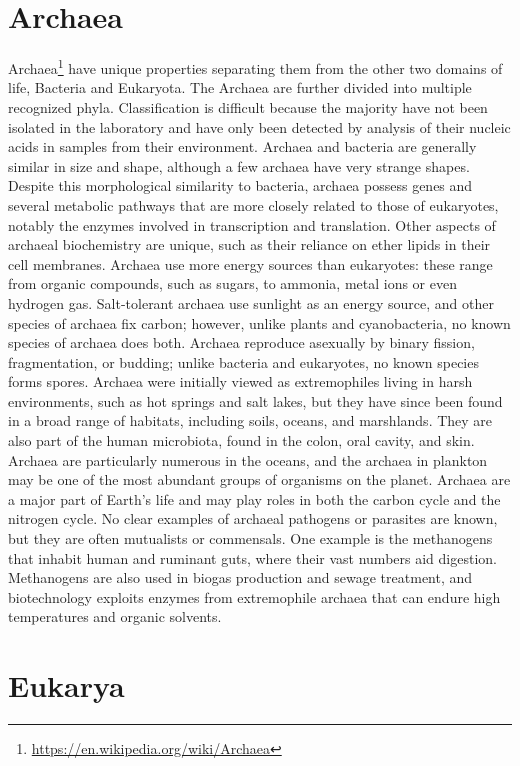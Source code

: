 \documentclass[]{book}
\let\rmarkdownfootnote\footnote%
\def\footnote{\protect\rmarkdownfootnote}
\renewcommand{\href}[2]{#2\footnote{\url{#1}}}
\theoremstyle{definition}
\theoremstyle{definition}
\theoremstyle{definition}
\theoremstyle{remark}
\begin{document}
\section{Archaea}\label{archaea}

\href{https://en.wikipedia.org/wiki/Archaea}{Archaea} have unique
properties separating them from the other two domains of life, Bacteria
and Eukaryota. The Archaea are further divided into multiple recognized
phyla. Classification is difficult because the majority have not been
isolated in the laboratory and have only been detected by analysis of
their nucleic acids in samples from their environment. Archaea and
bacteria are generally similar in size and shape, although a few archaea
have very strange shapes. Despite this morphological similarity to
bacteria, archaea possess genes and several metabolic pathways that are
more closely related to those of eukaryotes, notably the enzymes
involved in transcription and translation. Other aspects of archaeal
biochemistry are unique, such as their reliance on ether lipids in their
cell membranes. Archaea use more energy sources than eukaryotes: these
range from organic compounds, such as sugars, to ammonia, metal ions or
even hydrogen gas. Salt-tolerant archaea use sunlight as an energy
source, and other species of archaea fix carbon; however, unlike plants
and cyanobacteria, no known species of archaea does both. Archaea
reproduce asexually by binary fission, fragmentation, or budding; unlike
bacteria and eukaryotes, no known species forms spores. Archaea were
initially viewed as extremophiles living in harsh environments, such as
hot springs and salt lakes, but they have since been found in a broad
range of habitats, including soils, oceans, and marshlands. They are
also part of the human microbiota, found in the colon, oral cavity, and
skin. Archaea are particularly numerous in the oceans, and the archaea
in plankton may be one of the most abundant groups of organisms on the
planet. Archaea are a major part of Earth's life and may play roles in
both the carbon cycle and the nitrogen cycle. No clear examples of
archaeal pathogens or parasites are known, but they are often mutualists
or commensals. One example is the methanogens that inhabit human and
ruminant guts, where their vast numbers aid digestion. Methanogens are
also used in biogas production and sewage treatment, and biotechnology
exploits enzymes from extremophile archaea that can endure high
temperatures and organic solvents.

\section{Eukarya}\label{eukarya}
\end{document}
